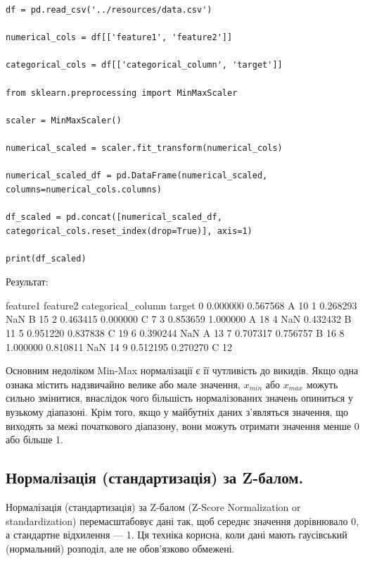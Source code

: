 \begin{lstlisting}
df = pd.read_csv('../resources/data.csv')

numerical_cols = df[['feature1', 'feature2']]

categorical_cols = df[['categorical_column', 'target']]

from sklearn.preprocessing import MinMaxScaler

scaler = MinMaxScaler()

numerical_scaled = scaler.fit_transform(numerical_cols)

numerical_scaled_df = pd.DataFrame(numerical_scaled, columns=numerical_cols.columns)

df_scaled = pd.concat([numerical_scaled_df, categorical_cols.reset_index(drop=True)], axis=1)

print(df_scaled)
\end{lstlisting}

Результат:

\begin{console}
   feature1  feature2 categorical_column  target
0  0.000000  0.567568                  A      10
1  0.268293       NaN                  B      15
2  0.463415  0.000000                  C       7
3  0.853659  1.000000                  A      18
4       NaN  0.432432                  B      11
5  0.951220  0.837838                  C      19
6  0.390244       NaN                  A      13
7  0.707317  0.756757                  B      16
8  1.000000  0.810811                NaN      14
9  0.512195  0.270270                  C      12
\end{console}

 Основним недоліком Min-Max нормалізації є її чутливість до викидів. Якщо одна ознака містить надзвичайно велике або мале значення, $x_{min}$ або $x_{max}$ можуть сильно змінитися, внаслідок чого більшість нормалізованих значень опиниться у вузькому діапазоні. Крім того, якщо у майбутніх даних з'являться значення, що виходять за межі початкового діапазону, вони можуть отримати значення менше 0 або більше 1.


\subsection{Нормалізація (стандартизація) за Z-балом.}

Нормалізація (стандартизація) за Z-балом (Z-Score Normalization or standardization) перемасштабовує дані так, щоб середнє значення дорівнювало 0, а стандартне відхилення — 1. 
Ця техніка корисна, коли дані мають гаусівський (нормальний) розподіл, але не обов'язково обмежені.

